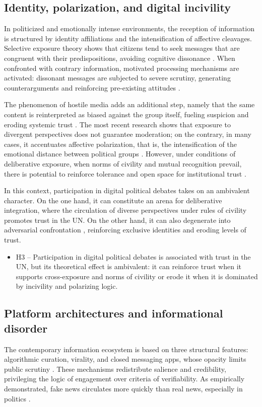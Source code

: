 \documentclass[english]{textolivre}
\begin{document}
\subsection{Identity, polarization, and digital incivility}
In politicized and emotionally intense environments, the reception of information is structured by identity affiliations and the intensification of affective cleavages. Selective exposure theory shows that citizens tend to seek messages that are congruent with their predispositions, avoiding cognitive dissonance \cite{stroud2010}. When confronted with contrary information, motivated processing mechanisms are activated: dissonant messages are subjected to severe scrutiny, generating counterarguments and reinforcing pre-existing attitudes \cite{taber2006}.

The phenomenon of hostile media adds an additional step, namely that the same content is reinterpreted as biased against the group itself, fueling suspicion and eroding systemic trust \cite{vallone1985}. The most recent research shows that exposure to divergent perspectives does not guarantee moderation; on the contrary, in many cases, it accentuates affective polarization, that is, the intensification of the emotional distance between political groups \cite{iyengar2019, bail2018}. However, under conditions of deliberative exposure, when norms of civility and mutual recognition prevail, there is potential to reinforce tolerance and open space for institutional trust \cite{mutz2006, gidron2020}.

In this context, participation in digital political debates takes on an ambivalent character. On the one hand, it can constitute an arena for deliberative integration, where the circulation of diverse perspectives under rules of civility promotes trust in the UN. On the other hand, it can also degenerate into adversarial confrontation \cite{oliveira2025}, reinforcing exclusive identities and eroding levels of trust.

\begin{itemize}
    \item H3 -- Participation in digital political debates is associated with trust in the UN, but its theoretical effect is ambivalent: it can reinforce trust when it supports cross-exposure and norms of civility or erode it when it is dominated by incivility and polarizing logic.
\end{itemize}



\subsection{Platform architectures and informational disorder}
The contemporary information ecosystem is based on three structural features: algorithmic curation, virality, and closed messaging apps, whose opacity limits public scrutiny \cite{wolfsfeld2016}. These mechanisms redistribute salience and credibility, privileging the logic of engagement over criteria of verifiability. As empirically demonstrated, fake news circulates more quickly than real news, especially in politics \cite{vosoughi2018}.
\end{document}
